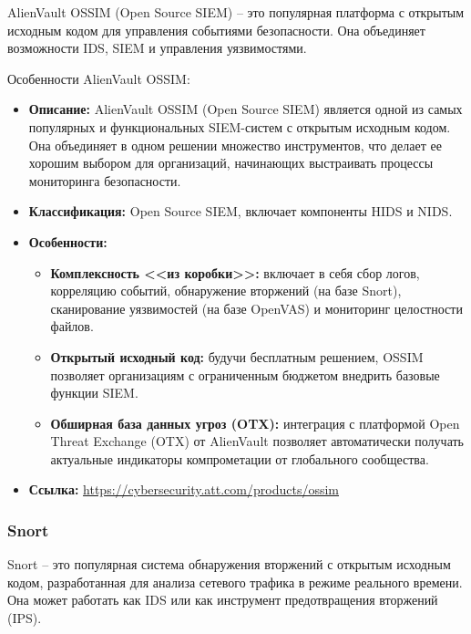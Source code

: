 AlienVault OSSIM (Open Source SIEM) -- это популярная платформа с открытым исходным кодом для управления событиями безопасности. Она объединяет возможности IDS, SIEM и управления уязвимостями.

Особенности AlienVault OSSIM:
\begin{itemize}
		\item \textbf{Описание:} AlienVault OSSIM (Open Source SIEM) является одной из самых популярных и функциональных SIEM-систем с открытым исходным кодом. Она объединяет в одном решении множество инструментов, что делает ее хорошим выбором для организаций, начинающих выстраивать процессы мониторинга безопасности.
    \item \textbf{Классификация:} Open Source SIEM, включает компоненты HIDS и NIDS.
    \item \textbf{Особенности:}
    \begin{itemize}
        \item \textbf{Комплексность <<из коробки>>:} включает в себя сбор логов, корреляцию событий, обнаружение вторжений (на базе Snort), сканирование уязвимостей (на базе OpenVAS) и мониторинг целостности файлов.
        \item \textbf{Открытый исходный код:} будучи бесплатным решением, OSSIM позволяет организациям с ограниченным бюджетом внедрить базовые функции SIEM.
        \item \textbf{Обширная база данных угроз (OTX):} интеграция с платформой Open Threat Exchange (OTX) от AlienVault позволяет автоматически получать актуальные индикаторы компрометации от глобального сообщества.
    \end{itemize}
    \item \textbf{Ссылка:} \url{https://cybersecurity.att.com/products/ossim}
\end{itemize}

\subsubsection{Snort}

Snort -- это популярная система обнаружения вторжений с открытым исходным кодом, разработанная для анализа сетевого трафика в режиме реального времени. Она может работать как IDS или как инструмент предотвращения вторжений (IPS).

